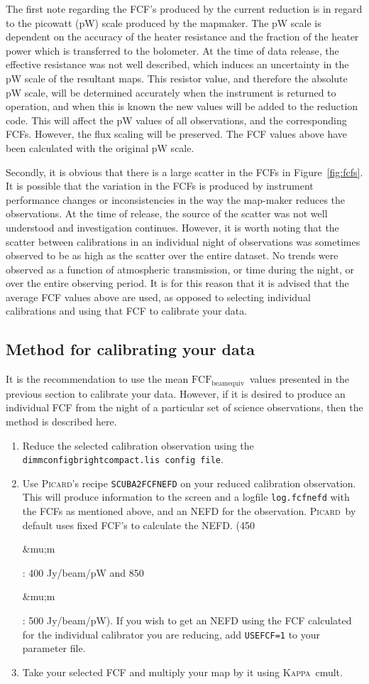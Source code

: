 \documentclass[twoside,11pt]{article}
\newcommand{\micron}{\mbox{\,${\umu}$m}}            %
\newcommand{\xref}[3]{#1}
\renewcommand{\_}{\texttt{\symbol{95}}}
\newcommand{\fcfbe}{$\mathrm{FCF_{beamequiv}}$}
\newcommand{\Kappa}{\xref{\textsc{Kappa}}{sun95}{}}
\newcommand{\picard}{\xref{\textsc{Picard}}{sun231}{}}
\newcommand{\drrecipe}[1]{\texttt{#1}}
\newcommand{\task}[1]{\textsf{#1}}
\newcommand{\cmult}{\xref{\task{cmult}}{sun95}{CMULT}}
\renewcommand{\micron}{\begin{rawhtml}&mu;m\end{rawhtml}}
\begin{document}
The first note regarding the FCF's produced by the current reduction
is in regard to the picowatt (pW) scale produced by the mapmaker. The
pW scale is dependent on the accuracy of the heater resistance and the
fraction of the heater power which is transferred to the bolometer. At
the time of data release, the effective resistance was not well
described, which induces an uncertainty in the pW scale of the
resultant maps. This resistor value, and therefore the absolute pW
scale, will be determined accurately when the instrument is returned
to operation, and when this is known the new values will be added to
the reduction code. This will affect the pW values of all
observations, and the corresponding FCFs. However, the flux scaling
will be preserved. The FCF values above have been calculated with the
original pW scale.

Secondly, it is obvious that there is a large scatter in the FCFs in
Figure~\ref{fig:fcfs}. It is possible that the variation in the FCFs
is produced by instrument performance changes or inconsistencies in
the way the map-maker reduces the observations. At the time of
release, the source of the scatter was not well understood and
investigation continues. However, it is worth noting that the scatter
between calibrations in an individual night of observations was
sometimes observed to be as high as the scatter over the entire
dataset. No trends were observed as a function of atmospheric
transmission, or time during the night, or over the entire observing
period. It is for this reason that it is advised that the average FCF
values above are used, as opposed to selecting individual calibrations
and using that FCF to calibrate your data.

\subsection{Method for calibrating your data}


It is the recommendation to use the mean \fcfbe\ values
presented in the previous section to calibrate your data. However, if
it is desired to produce an individual FCF from the night of a
particular set of science observations, then the method is described
here.

\begin{enumerate}
\item{Reduce the selected calibration observation using the
\texttt{dimmconfig\_bright\_compact.lis config file}.}
\item{Use \picard's recipe \drrecipe{SCUBA2\_FCFNEFD} on your reduced calibration
    observation. This will produce information to the screen and a
    logfile \texttt{log.fcfnefd} with the FCFs as mentioned above, and an NEFD
    for the observation. \picard\ by default uses fixed FCF's to
    calculate the NEFD. (450\micron: 400 Jy/beam/pW and 850\micron: 500
    Jy/beam/pW). If you wish to get an NEFD using the FCF calculated
    for the individual calibrator you are reducing, add \texttt{USEFCF=1} to
    your parameter file. }
\item{Take your selected FCF and multiply your map by it using \Kappa\
    \cmult.}
\end{enumerate}
\end{document}
